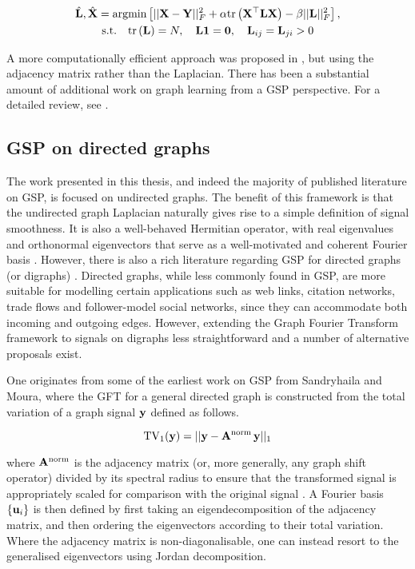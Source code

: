 \begin{equation}
    \begin{gathered}
        \hat{\mathbf{L}}, \hat{\mathbf{X}} = \text{argmin} \left[ ||\mathbf{X} - \mathbf{Y}||_F^2 + \alpha \text{\textup{tr}}\left(\mathbf{X}^\top \mathbf{L} \mathbf{X}\right) - \beta ||\mathbf{L} ||_F^2 \right], \\ \text{s.t.} \quad \text{\textup{tr}}\left(\mathbf{L}\right) = N, \quad \mathbf{L} \mathbf{1} = \mathbf{0}, \quad \mathbf{L}_{ij} = \mathbf{L}_{ji} > 0
    \end{gathered}
\end{equation}

A more computationally efficient approach was proposed in \cite{Kalofolias2016}, but using the adjacency matrix rather than the Laplacian. There has been a substantial amount of additional work on graph learning from a GSP perspective. For a detailed review, see \cite{Dong2019,Mateos2019}. 


\subsection{GSP on directed graphs}

The work presented in this thesis, and indeed the majority of published literature on GSP, is focused on undirected graphs. The benefit of this framework is that the undirected graph Laplacian naturally gives rise to a simple definition of signal smoothness. It is also a well-behaved Hermitian operator, with real eigenvalues and orthonormal eigenvectors that serve as a well-motivated and coherent Fourier basis \citep{Ortega2018}. However, there is also a rich literature regarding GSP for directed graphs (or digraphs) \citep{Marques2020}. Directed graphs, while less commonly found in GSP, are more suitable for modelling certain applications such as web links, citation networks, trade flows and follower-model social networks, since they can accommodate both incoming and outgoing edges. However, extending the Graph Fourier Transform framework to signals on digraphs less straightforward and a number of alternative proposals exist. 

One originates from some of the earliest work on GSP from Sandryhaila and Moura, where the GFT for a general directed graph is constructed from the total variation of a graph signal $\mathbf{y}$ defined as follows. 

\begin{equation}
    \text{TV}_1(\mathbf{y}) = || \mathbf{y} - \mathbf{A}^{\text{norm}} \, \mathbf{y} ||_1
\end{equation}

where $\mathbf{A}^{\text{norm}}$ is the adjacency matrix (or, more generally, any graph shift operator) divided by its spectral radius to ensure that the transformed signal is appropriately scaled for comparison with the original signal \citep{Sandryhaila2013b}. A Fourier basis $\{\mathbf{u}_i \}$ is then defined by first taking an eigendecomposition of the adjacency matrix, and then ordering the eigenvectors according to their total variation. Where the adjacency matrix is non-diagonalisable, one can instead resort to the generalised eigenvectors using Jordan decomposition. 

